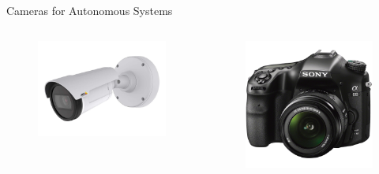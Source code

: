 \documentclass{beamer}
\begin{document}
\begin{frame}{Cameras for Autonomous Systems}
  \begin{columns}
    \begin{column}{0.5\columnwidth}
      \begin{figure}
        \centering
        \includegraphics[width=1.0\textwidth]{problem/axis_cam}
      \end{figure}
    \end{column}
    \begin{column}{0.5\columnwidth}
      \begin{figure}
        \centering
        \includegraphics[width=1.0\textwidth]{problem/dslr}
      \end{figure}
    \end{column}
  \end{columns}
\end{frame}
\end{document}

